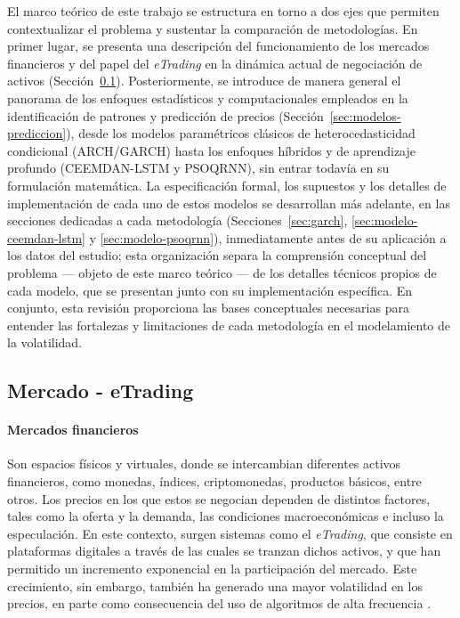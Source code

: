 \documentclass[12pt]{paper}
\begin{document}
El marco teórico de este trabajo se estructura en torno a dos ejes que permiten contextualizar el problema y sustentar la comparación de metodologías. En primer lugar, se presenta una descripción del funcionamiento de los mercados financieros y del papel del \textit{eTrading} en la dinámica actual de negociación de activos (Sección~\ref{sec:etrading}). Posteriormente, se introduce de manera general el panorama de los enfoques estadísticos y computacionales empleados en la identificación de patrones y predicción de precios (Sección~\ref{sec:modelos-prediccion}), desde los modelos paramétricos clásicos de heterocedasticidad condicional (ARCH/GARCH) hasta los enfoques híbridos y de aprendizaje profundo (CEEMDAN-LSTM y PSOQRNN), sin entrar todavía en su formulación matemática. La especificación formal, los supuestos y los detalles de implementación de cada uno de estos modelos se desarrollan más adelante, en las secciones dedicadas a cada metodología (Secciones~\ref{sec:garch}, \ref{sec:modelo-ceemdan-lstm} y \ref{sec:modelo-psoqrnn}), inmediatamente antes de su aplicación a los datos del estudio; esta organización separa la comprensión conceptual del problema --- objeto de este marco teórico --- de los detalles técnicos propios de cada modelo, que se presentan junto con su implementación específica. En conjunto, esta revisión proporciona las bases conceptuales necesarias para entender las fortalezas y limitaciones de cada metodología en el modelamiento de la volatilidad.

\subsection[Mercado - eTrading]{Mercado - eTrading}
\label{sec:etrading}

\paragraph{Mercados financieros}
Son espacios físicos y virtuales, donde se intercambian diferentes activos financieros, como monedas, índices, criptomonedas, productos básicos, entre otros. Los precios en los que estos se negocian dependen de distintos factores, tales como la oferta y la demanda, las condiciones macroeconómicas e incluso la especulación. En este contexto, surgen sistemas como el \textit{eTrading}, que consiste en plataformas digitales a través de las cuales se tranzan dichos activos, y que han permitido un incremento exponencial en la participación del mercado. Este crecimiento, sin embargo, también ha generado una mayor volatilidad en los precios, en parte como consecuencia del uso de algoritmos de alta frecuencia \cite{jansen2020machine}.
\end{document}
